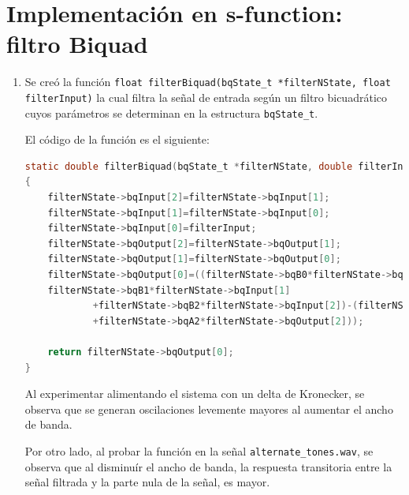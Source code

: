 \documentclass[letterpaper,onecolumn,10pt,journal,final]{IEEEtran}
\begin{document}
\section{Implementación en s-function: filtro Biquad}
\begin{enumerate}[1)]
    \item %
        
        Se creó la función \texttt{float filterBiquad(bqState\_t *filterNState, float filterInput)} la cual filtra la señal de entrada según un filtro bicuadrático cuyos parámetros se determinan en la estructura \texttt{bqState\_t}.

        El código de la función es el siguiente:
        \begin{lstlisting}[language=C]
        static double filterBiquad(bqState_t *filterNState, double filterInput)
{
    filterNState->bqInput[2]=filterNState->bqInput[1];
    filterNState->bqInput[1]=filterNState->bqInput[0];
    filterNState->bqInput[0]=filterInput;
    filterNState->bqOutput[2]=filterNState->bqOutput[1];
    filterNState->bqOutput[1]=filterNState->bqOutput[0];
    filterNState->bqOutput[0]=((filterNState->bqB0*filterNState->bqInput[0]+
    filterNState->bqB1*filterNState->bqInput[1]
            +filterNState->bqB2*filterNState->bqInput[2])-(filterNState->bqA1*filterNState->bqOutput[1]
            +filterNState->bqA2*filterNState->bqOutput[2]));
            
    return filterNState->bqOutput[0];
}
\end{lstlisting}
Al experimentar alimentando el sistema con un delta de Kronecker, se observa que se generan oscilaciones levemente mayores al aumentar el ancho de banda.

Por otro lado, al probar la función en la señal \texttt{alternate\_tones.wav}, se observa que al disminuír el ancho de banda, la respuesta transitoria entre la señal filtrada y la parte nula de la señal, es mayor.


\end{enumerate}
\end{document}
